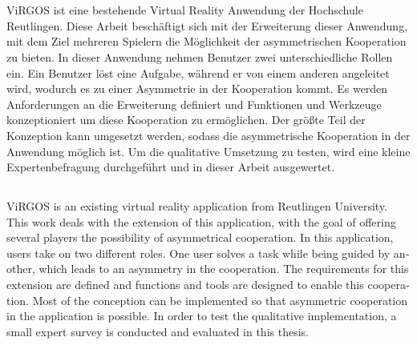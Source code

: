 \documentclass[12pt,oneside,a4paper]{article}
\begin{document}
\large


\section*{}
ViRGOS ist eine bestehende Virtual Reality Anwendung der Hochschule Reutlingen. Diese Arbeit beschäftigt sich mit der Erweiterung dieser Anwendung, mit dem Ziel mehreren Spielern die Möglichkeit der asymmetrischen Kooperation zu bieten. In dieser Anwendung nehmen Benutzer zwei unterschiedliche Rollen ein. Ein Benutzer löst eine Aufgabe, während er von einem anderen angeleitet wird, wodurch es zu einer Asymmetrie in der K­ooperation kommt. Es werden Anforderungen an die Erweiterung definiert und Funktionen und Werkzeuge konzeptioniert um diese Kooperation zu ermöglichen. Der größte Teil der Konzeption kann umgesetzt werden, sodass die asymmetrische Kooperation in der Anwendung möglich ist. Um die qualitative Umsetzung zu testen, wird eine kleine Expertenbefragung durchgeführt und in dieser Arbeit ausgewertet.\\

\begin{otherlanguage}{english}
\section*{}
ViRGOS is an existing virtual reality application from Reutlingen University. This work deals with the extension of this application, with the goal of offering several players the possibility of asymmetrical cooperation. In this application, users take on two different roles. One user solves a task while being guided by another, which leads to an asymmetry in the cooperation. The requirements for this extension are defined and functions and tools are designed to enable this cooperation. Most of the conception can be implemented so that asymmetric cooperation in the application is possible. In order to test the qualitative implementation, a small expert survey is conducted and evaluated in this thesis.\\
\end{otherlanguage}

\newpage

\tableofcontents

\newpage
\listoffigures




 



\newpage
\printbibliography[heading=bibintoc] 



\end{document}
